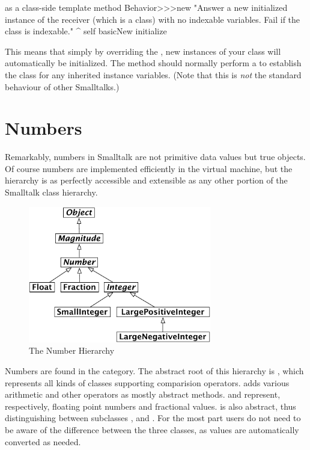 \documentclass[a4paper,10pt,twoside]{book}
\begin{document}
\begin{method}{ as a class-side template method}
Behavior>>>new
    "Answer a new initialized instance of the receiver (which is a class) with no indexable
    variables. Fail if the class is indexable."
    ^ self basicNew initialize
\end{method}

This means that simply by overriding the  , new instances of your class will automatically be initialized. The  method should normally perform a  to establish the class  for any inherited instance variables.
(Note that this is \emph{not} the standard behaviour of other Smalltalks.)

\section{Numbers}
Remarkably, numbers in Smalltalk are not primitive data values but true objects. Of course numbers are implemented efficiently in the virtual machine, but the  hierarchy is as perfectly accessible and extensible as any other portion of the Smalltalk class hierarchy.

\begin{figure}[ht]
\centerline {\includegraphics[width=8cm]{NumberHierarchy}}
\caption{The Number Hierarchy }
\end{figure}

Numbers are found in the  category. The abstract root of this hierarchy is , which represents all kinds of classes supporting comparision operators.  adds various arithmetic and other operators as mostly abstract methods.  and  represent, respectively, floating point numbers and fractional values.   is also abstract, thus distinguishing between subclasses ,  and . For the most part users do not need to be aware of the difference between the three  classes, as values are automatically converted as needed.
\end{document}
